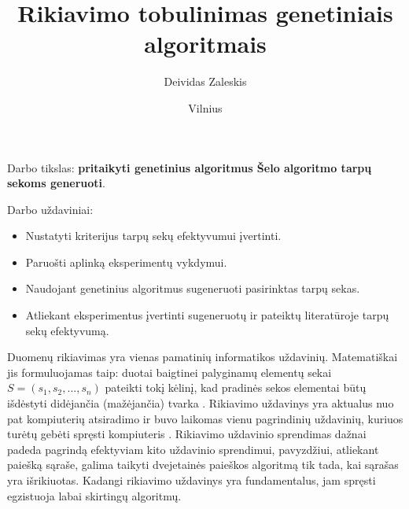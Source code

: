 \documentclass{VUMIFInfKursinis}
\institute{Informatikos institutas}  %
\title{Rikiavimo tobulinimas genetiniais algoritmais}
\author{Deividas Zaleskis}
\date{Vilnius \\ \the\year}
\begin{document}
\maketitle

\tableofcontents



Darbo tikslas:
\textbf{pritaikyti genetinius algoritmus Šelo algoritmo tarpų sekoms generuoti}.

\bigskip

Darbo uždaviniai:

\begin{itemize}
  \item Nustatyti kriterijus tarpų sekų efektyvumui įvertinti.
  \item Paruošti aplinką eksperimentų vykdymui.
  \item Naudojant genetinius algoritmus sugeneruoti pasirinktas tarpų sekas.
  \item Atliekant eksperimentus įvertinti sugeneruotų ir pateiktų literatūroje tarpų sekų efektyvumą.
\end{itemize}


Duomenų rikiavimas yra vienas pamatinių informatikos uždavinių.
Matematiškai jis formuluojamas taip:
duotai baigtinei palyginamų elementų sekai $S = (s_1, s_2, ..., s_n)$ pateikti tokį
kėlinį, kad pradinės sekos elementai būtų išdėstyti didėjančia (mažėjančia) tvarka \cite{Radavičius_Baranauskas_2013}.
Rikiavimo uždavinys yra aktualus nuo pat kompiuterių atsiradimo ir buvo laikomas vienu 
pagrindinių uždavinių, kuriuos turėtų gebėti spręsti kompiuteris \cite{10.1145/356580.356581}.
Rikiavimo uždavinio sprendimas dažnai padeda pagrindą efektyviam kito uždavinio sprendimui,
pavyzdžiui, atliekant paiešką sąraše, galima taikyti dvejetainės paieškos algoritmą tik tada,
kai sąrašas yra išrikiuotas.
Kadangi rikiavimo uždavinys yra fundamentalus, jam spręsti egzistuoja labai skirtingų algoritmų.
\end{document}
